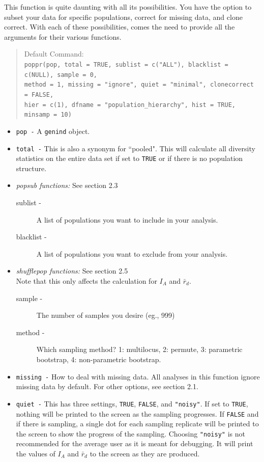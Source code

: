 \documentclass[letterpaper]{article}
\newcommand{\tab}{\hspace*{1em}}
\begin{document}
\tab\tab This function is quite daunting with all its possibilities. You have the option to subset your data for specific populations, correct for missing data, and clone correct. With each of these possibilities, comes the need to provide all the arguments for their various functions.
\begin{quote}
Default Command:\\
\texttt{poppr(pop, total = TRUE, sublist = c("ALL"), blacklist = c(NULL), sample = 0,\\ 
        \tab method = 1, missing = "ignore", quiet = "minimal", clonecorrect = FALSE,\\ 
        \tab hier = c(1), dfname = "population\_hierarchy", hist = TRUE, minsamp = 10)}
\end{quote}
\begin{itemize}
  \item \texttt{pop -} A \texttt{genind} object.
  \item \texttt{total -} This is also a synonym for ``pooled". This will calculate all diversity statistics on the entire data set if set to \texttt{TRUE} or if there is no population structure.
  \item \emph{popsub functions:} See section 2.3
  \begin{description}
    \item[sublist -] A list of populations you want to include in your analysis.
    \item[blacklist -] A list of populations you want to exclude from your analysis.
  \end{description}
  \item \emph{shufflepop functions:} See section 2.5 \\ Note that this only affects the calculation for $I_A$ and $\bar r_d$.
  \begin{description}
    \item[sample -] The number of samples you desire (eg., 999)
    \item[method -] Which sampling method? 1: multilocus, 2: permute, 3: parametric bootstrap, 4: non-parametric bootstrap.
  \end{description}
  \item \texttt{missing -} How to deal with missing data. All analyses in this function ignore missing data by default. For other options, see section 2.1.
  \item \texttt{quiet -} This has three settings, \texttt{TRUE}, \texttt{FALSE}, and \texttt{"noisy"}. If set to \texttt{TRUE}, nothing will be printed to the screen as the sampling progresses. If \texttt{FALSE} and if there is sampling, a single dot for each sampling replicate will be printed to the screen to show the progress of the sampling. Choosing \texttt{"noisy"} is not recommended for the average user as it is meant for debugging. It will print the values of $I_A$ and $\bar r_d$ to the screen as they are produced. 

\end{itemize}
\end{document}
